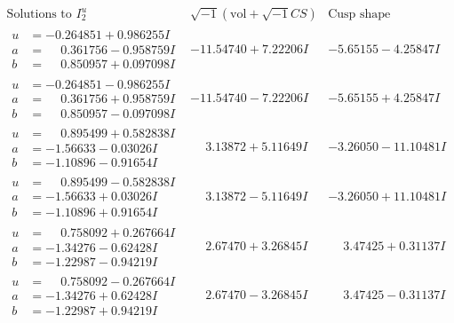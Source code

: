 \documentclass[1p]{elsarticle_modified}
\theoremstyle{definition}
\newcommand{\I}{\sqrt{-1}}
\begin{document}
$$\begin{array}{c|c|c}  
\text{Solutions to }I^u_{2}& \I (\text{vol} + \sqrt{-1}CS) & \text{Cusp shape}\\
 \hline 
\begin{aligned}
u &= -0.264851 + 0.986255 I \\
a &= \phantom{-}0.361756 - 0.958759 I \\
b &= \phantom{-}0.850957 + 0.097098 I\end{aligned}
 & -11.54740 + 7.22206 I & -5.65155 - 4.25847 I \\ \hline\begin{aligned}
u &= -0.264851 - 0.986255 I \\
a &= \phantom{-}0.361756 + 0.958759 I \\
b &= \phantom{-}0.850957 - 0.097098 I\end{aligned}
 & -11.54740 - 7.22206 I & -5.65155 + 4.25847 I \\ \hline\begin{aligned}
u &= \phantom{-}0.895499 + 0.582838 I \\
a &= -1.56633 - 0.03026 I \\
b &= -1.10896 - 0.91654 I\end{aligned}
 & \phantom{-}3.13872 + 5.11649 I & -3.26050 - 11.10481 I \\ \hline\begin{aligned}
u &= \phantom{-}0.895499 - 0.582838 I \\
a &= -1.56633 + 0.03026 I \\
b &= -1.10896 + 0.91654 I\end{aligned}
 & \phantom{-}3.13872 - 5.11649 I & -3.26050 + 11.10481 I \\ \hline\begin{aligned}
u &= \phantom{-}0.758092 + 0.267664 I \\
a &= -1.34276 - 0.62428 I \\
b &= -1.22987 - 0.94219 I\end{aligned}
 & \phantom{-}2.67470 + 3.26845 I & \phantom{-}3.47425 + 0.31137 I \\ \hline\begin{aligned}
u &= \phantom{-}0.758092 - 0.267664 I \\
a &= -1.34276 + 0.62428 I \\
b &= -1.22987 + 0.94219 I\end{aligned}
 & \phantom{-}2.67470 - 3.26845 I & \phantom{-}3.47425 - 0.31137 I \\ \hline\begin{aligned}

\end{aligned}
\end{array}$$
\end{document}
